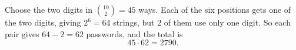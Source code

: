 Choose the two digits in $\binom{10}{2}=45$ ways. Each of the six positions gets one of the two digits, giving $2^6=64$ strings, but $2$ of them use only one digit. So each pair gives $64-2=62$ passwords, and the total is
\[
45\cdot62=\boxed{2790}.
\]
